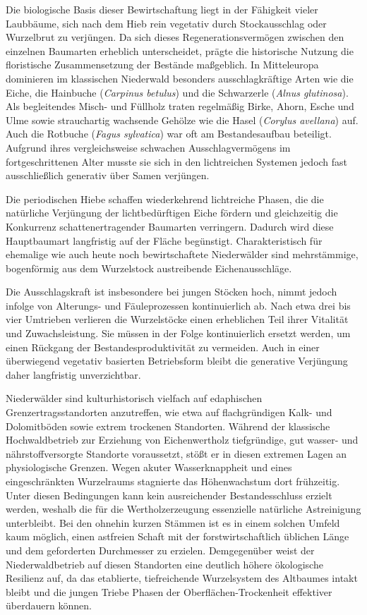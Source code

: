 \documentclass[twocolumn, bibliography=totoc, abstract=true]{scrartcl}
\begin{document}
Die biologische Basis dieser Bewirtschaftung liegt in der Fähigkeit vieler Laubbäume, sich nach dem Hieb rein vegetativ durch Stockausschlag oder Wurzelbrut zu verjüngen. Da sich dieses Regenerationsvermögen zwischen den einzelnen Baumarten erheblich unterscheidet, prägte die historische Nutzung die floristische Zusammensetzung der Bestände maßgeblich. In Mitteleuropa dominieren im klassischen Niederwald besonders ausschlagkräftige Arten wie die Eiche, die Hainbuche (\textit{Carpinus betulus}) und die Schwarzerle (\textit{Alnus glutinosa}). Als begleitendes Misch- und Füllholz traten regelmäßig Birke, Ahorn, Esche und Ulme sowie strauchartig wachsende Gehölze wie die Hasel (\textit{Corylus avellana}) auf. Auch die Rotbuche (\textit{Fagus sylvatica}) war oft am Bestandesaufbau beteiligt. Aufgrund ihres vergleichsweise schwachen Ausschlagvermögens im fortgeschrittenen Alter musste sie sich in den lichtreichen Systemen jedoch fast ausschließlich generativ über Samen verjüngen.

Die periodischen Hiebe schaffen wiederkehrend lichtreiche Phasen, die die natürliche Verjüngung der lichtbedürftigen Eiche fördern und gleichzeitig die Konkurrenz schattenertragender Baumarten verringern. Dadurch wird diese Hauptbaumart langfristig auf der Fläche begünstigt. Charakteristisch für ehemalige wie auch heute noch bewirtschaftete Niederwälder sind mehrstämmige, bogenförmig aus dem Wurzelstock austreibende Eichenausschläge.

Die Ausschlagskraft ist insbesondere bei jungen Stöcken hoch, nimmt jedoch infolge von Alterungs- und Fäuleprozessen kontinuierlich ab. Nach etwa drei bis vier Umtrieben verlieren die Wurzelstöcke einen erheblichen Teil ihrer Vitalität und Zuwachsleistung. Sie müssen in der Folge kontinuierlich ersetzt werden, um einen Rückgang der Bestandesproduktivität zu vermeiden. Auch in einer überwiegend vegetativ basierten Betriebsform bleibt die generative Verjüngung daher langfristig unverzichtbar.

Niederwälder sind kulturhistorisch vielfach auf edaphischen Grenzertragsstandorten anzutreffen, wie etwa auf flachgründigen Kalk- und Dolomitböden sowie extrem trockenen Standorten. Während der klassische Hochwaldbetrieb zur Erziehung von Eichenwertholz tiefgründige, gut wasser- und nährstoffversorgte Standorte voraussetzt, stößt er in diesen extremen Lagen an physiologische Grenzen. Wegen akuter Wasserknappheit und eines eingeschränkten Wurzelraums stagnierte das Höhenwachstum dort frühzeitig. Unter diesen Bedingungen kann kein ausreichender Bestandesschluss erzielt werden, weshalb die für die Wertholzerzeugung essenzielle natürliche Astreinigung unterbleibt. Bei den ohnehin kurzen Stämmen ist es in einem solchen Umfeld kaum möglich, einen astfreien Schaft mit der forstwirtschaftlich üblichen Länge und dem geforderten Durchmesser zu erzielen. Demgegenüber weist der Niederwaldbetrieb auf diesen Standorten eine deutlich höhere ökologische Resilienz auf, da das etablierte, tiefreichende Wurzelsystem des Altbaumes intakt bleibt und die jungen Triebe Phasen der Oberflächen-Trockenheit effektiver überdauern können.
\end{document}
